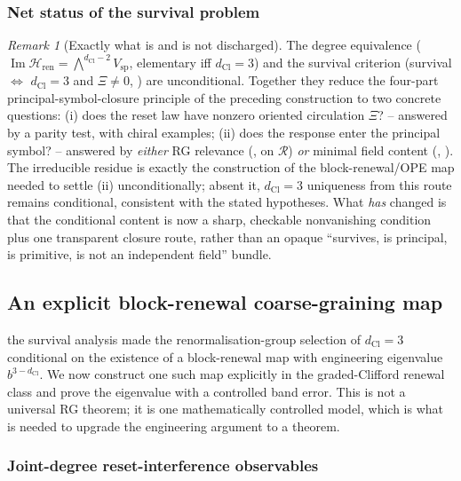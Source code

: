 \documentclass[11pt]{article}
\theoremstyle{definition}
\theoremstyle{remark}
\newtheorem{remark}[theorem]{Remark}
\newcommand{\dCl}{d_{\mathrm{Cl}}}
\newcommand{\Vsp}{V_{\mathrm{sp}}}
\newcommand{\Img}{\operatorname{Im}}
\newcommand{\Hren}{\mathcal{H}_{\mathrm{ren}}}
\begin{document}
\subsubsection{Net status of the survival problem}

\begin{remark}[Exactly what is and is not discharged]
\label{rem:cxi-status}
The degree equivalence ($\Img\Hren=\bigwedge^{\dCl-2}\Vsp$, elementary
iff $\dCl=3$) and the survival criterion (survival $\Leftrightarrow$ $\dCl=3$ and
$\Xi\neq0$, ) are unconditional.  Together they reduce
the four-part principal-symbol-closure principle of the preceding construction to two concrete
questions: (i) does the reset law have nonzero oriented circulation $\Xi$? --
answered by a parity test, with chiral examples; (ii) does the response enter the
principal symbol? -- answered by \emph{either} RG relevance
(, on $\mathscr R$) \emph{or} minimal field
content (, ).  The irreducible
residue is exactly the construction of the block-renewal/OPE map needed to settle
(ii) unconditionally; absent it, $\dCl=3$ uniqueness from this route remains
conditional, consistent with the stated hypotheses.  What \emph{has} changed is
that the conditional content is now a sharp, checkable nonvanishing condition plus
one transparent closure route, rather than an opaque ``survives, is principal, is
primitive, is not an independent field'' bundle.
\end{remark}



\subsection{An explicit block-renewal coarse-graining map}
\label{sec:cxiii}

the survival analysis made the renormalisation-group selection of $\dCl=3$ conditional on the
existence of a block-renewal map with engineering eigenvalue $b^{3-\dCl}$.  We now
construct one such map explicitly in the graded-Clifford renewal class and prove
the eigenvalue with a controlled band error.  This is not a universal RG theorem;
it is one mathematically controlled model, which is what is needed to upgrade the
engineering argument to a theorem.

\subsubsection{Joint-degree reset-interference observables}
\end{document}
